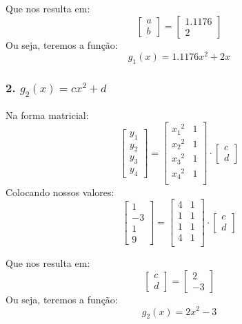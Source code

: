 \documentclass[12pt]{article}
\begin{document}
Que nos resulta em:
\[
\begin{bmatrix}
    a \\
    b
\end{bmatrix}
=
\begin{bmatrix}
    1.1176 \\
    2
\end{bmatrix}
\]
Ou seja, teremos a função:
\[
    \boxed{g_1(x) = 1.1176x^2 + 2x}
\]

\subsubsection*{2. \(g_2(x) = cx^2+d\)}
Na forma matricial:
\[
\begin{bmatrix}
    y_1 \\
    y_2 \\
    y_3 \\
    y_4
\end{bmatrix}
=
\begin{bmatrix}
    {x_1}^2 & 1 \\
    {x_2}^2 & 1 \\
    {x_3}^2 & 1 \\
    {x_4}^2 & 1 \\
\end{bmatrix}
\cdot
\begin{bmatrix}
    c \\
    d
\end{bmatrix}
\]
Colocando nossos valores:
\[
\begin{bmatrix}
    1 \\
    -3 \\
    1 \\
    9
\end{bmatrix}
=
\begin{bmatrix}
    4 & 1 \\
    1 & 1 \\
    1 & 1 \\
    4 & 1 \\
\end{bmatrix}
\cdot
\begin{bmatrix}
    c \\
    d
\end{bmatrix}
\]

Que nos resulta em:
\[
\begin{bmatrix}
    c \\
    d
\end{bmatrix}
=
\begin{bmatrix}
    2 \\
    -3
\end{bmatrix}
\]
Ou seja, teremos a função:
\[
    \boxed{g_2(x) = 2x^2 - 3}
\]
\end{document}

